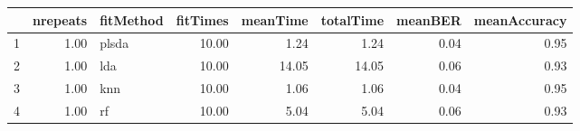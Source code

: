 \begin{table}[ht]
\centering
\begin{tabular}{rrlrrrrr}
  \hline
 & nrepeats & fitMethod & fitTimes & meanTime & totalTime & meanBER & meanAccuracy \\ 
  \hline
1 & 1.00 & plsda & 10.00 & 1.24 & 1.24 & 0.04 & 0.95 \\ 
  2 & 1.00 & lda & 10.00 & 14.05 & 14.05 & 0.06 & 0.93 \\ 
  3 & 1.00 & knn & 10.00 & 1.06 & 1.06 & 0.04 & 0.95 \\ 
  4 & 1.00 & rf & 10.00 & 5.04 & 5.04 & 0.06 & 0.93 \\ 
   \hline
\end{tabular}
\end{table}

